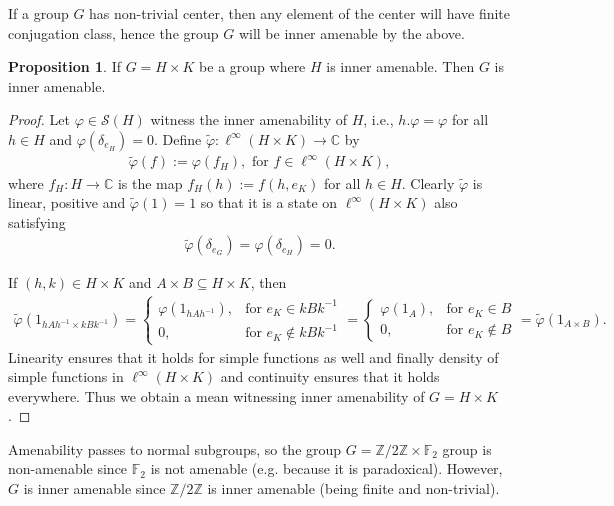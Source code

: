 \documentclass[10pt,oneside,openany,final]{memoir}
\theoremstyle{definition}
\newtheorem{proposition}[theorem]{Proposition}
\theoremstyle{Break}
\newcommand{\C}{\mathbb{C}}
\newcommand{\Z}{\mathbb{Z}}
\renewcommand{\S}{\mathcal{S}}
\begin{document}
If a group $G$ has non-trivial center, then any element of the center will have finite conjugation class, hence the group $G$ will be inner amenable by the above.

\begin{proposition}
	If $G=H \times K$ be a group where $H$ is inner amenable. Then $G$ is inner amenable.
\end{proposition}
\begin{proof}
	Let $\varphi \in \S(H)$ witness the inner amenability of $H$, i.e., $h.\varphi=\varphi$ for all $h \in H$ and $\varphi(\delta_{e_H})=0$. Define $\tilde{\varphi} \colon \ell^\infty(H \times K) \to \C$ by
	\begin{align*}
		\tilde{\varphi}(f):=\varphi\left(f_H \right), \text{ for } f \in \ell^\infty(H \times K),
	\end{align*}
	where $f_H \colon H \to \C$ is the map $f_H(h):=f(h,e_K)$ for all $h \in H$. Clearly $\tilde{\varphi}$ is linear, positive and $\tilde{\varphi}(1)=1$ so that it is a state on $\ell^\infty(H \times K)$ also satisfying 
	\begin{align*}
		\tilde{\varphi}(\delta_{e_G})=\varphi(\delta_{e_H})=0.
	\end{align*}

	If $(h,k) \in H \times K$ and $A\times B \subseteq H \times K$, then 
	\begin{align*}
		\tilde{\varphi}(1_{hAh^{-1}\times kBk^{-1}})
		=\begin{cases}
			\varphi(1_{hAh^{-1}}) , &\text{for }e_K \in kB k^{-1}\\
			0, &\text{for } e_K \not\in kB k^{-1}
		\end{cases}
		=\begin{cases}
			\varphi(1_{A}), &\text{for } e_K \in B\\
			0, &\text{for } e_K \not\in B
		\end{cases}= \tilde{\varphi}(1_{A \times B}).
	\end{align*}
	Linearity ensures that it holds for simple functions as well and finally density of simple functions in $\ell^\infty(H \times K)$ and continuity ensures that it holds everywhere. Thus we obtain a mean witnessing inner amenability of $G=H \times K$.
\end{proof}
Amenability passes to normal subgroups, so the group $G=\Z/2\Z \times \mathbb{F}_2$ group is non-amenable since $\mathbb{F}_2$ is not amenable (e.g. because it is paradoxical). However, $G$ is inner amenable since $\Z/2\Z$ is inner amenable (being finite and non-trivial). 
\end{document}

